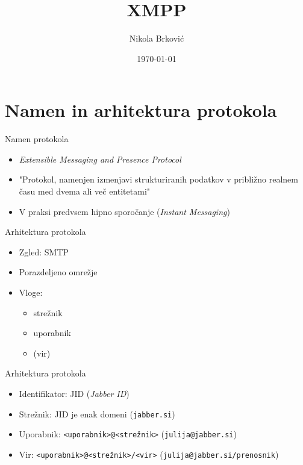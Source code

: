\documentclass[presentation]{beamer}
\author{Nikola Brković}
\date{\today}
\title{XMPP}
\begin{document}
\maketitle

\section{Namen in arhitektura protokola}
\label{sec:org43ecd96}

\begin{frame}[label={sec:orgccea582}]{Namen protokola}
\begin{itemize}
\item \emph{Extensible Messaging and Presence Protocol}
\item "Protokol, namenjen izmenjavi strukturiranih podatkov v približno
realnem času med dvema ali več entitetami"
\item V praksi predvsem hipno sporočanje (\emph{Instant Messaging})
\end{itemize}
\end{frame}

\begin{frame}[label={sec:orgdb242ce}]{Arhitektura protokola}
\begin{itemize}
\item Zgled: SMTP
\item Porazdeljeno omrežje
\item Vloge:
\begin{itemize}
\item strežnik
\item uporabnik
\item (vir)
\end{itemize}
\end{itemize}
\end{frame}

\begin{frame}[label={sec:orga10567c},fragile]{Arhitektura protokola}
 \begin{itemize}
\item Identifikator: JID (\emph{Jabber ID})
\item Strežnik: JID je enak domeni (\texttt{jabber.si})
\item Uporabnik: \texttt{<uporabnik>@<strežnik>} (\texttt{julija@jabber.si})
\item Vir: \texttt{<uporabnik>@<strežnik>/<vir>} (\texttt{julija@jabber.si/prenosnik})
\end{itemize}
\end{frame}
\end{document}
